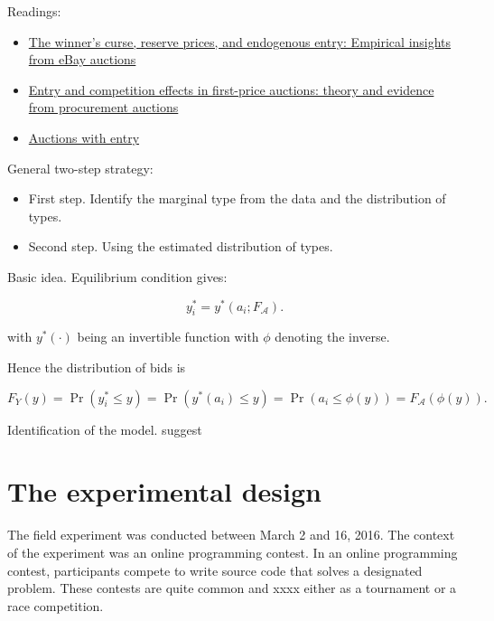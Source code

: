 \documentclass[12pt,]{article}
\begin{document}
Readings:

\begin{itemize}
\item
  \href{http://citeseerx.ist.psu.edu/viewdoc/download?doi=10.1.1.199.680\&rep=rep1\&type=pdf}{The
  winner's curse, reserve prices, and endogenous entry: Empirical
  insights from eBay auctions}
\item
  \href{https://www.econstor.eu/bitstream/10419/79263/1/516364804.pdf}{Entry
  and competition effects in first-price auctions: theory and evidence
  from procurement auctions}
\item
  \href{http://www.vita.mcafee.cc/PDF/AuctionswithEntry.pdf}{Auctions
  with entry}
\end{itemize}

General two-step strategy:

\begin{itemize}
\item
  First step. Identify the marginal type from the data and the
  distribution of types.
\item
  Second step. Using the estimated distribution of types.
\end{itemize}

Basic idea. Equilibrium condition gives:

\begin{equation}
  y_i^* = y^*(a_i; F_{\mathcal{A}}). 
\end{equation}

with \(y^*(\cdot)\) being an invertible function with \(\phi\) denoting
the inverse.

Hence the distribution of bids is

\begin{equation}
F_{Y}(y) = \Pr(y_i^* \leq y) 
        = \Pr(y^*(a_i) \leq y) 
        = \Pr(a_i \leq \phi(y)) 
        = F_\mathcal{A}( \phi(y)).
\end{equation}

Identification of the model. suggest

\section{The experimental design}\label{the-experimental-design}

The field experiment was conducted between March 2 and 16, 2016. The
context of the experiment was an online programming contest. In an
online programming contest, participants compete to write source code
that solves a designated problem. These contests are quite common and
xxxx either as a tournament or a race competition.
\end{document}
